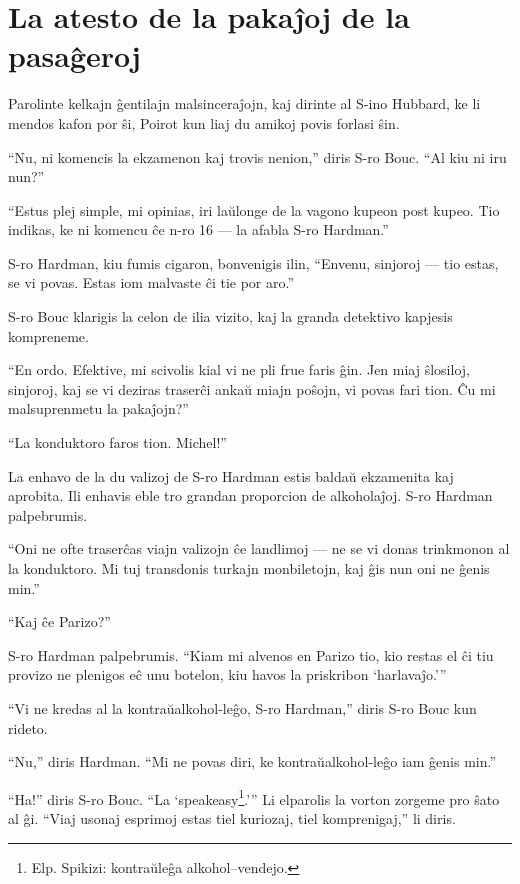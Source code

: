 \chapter[La atesto de la pakaĵoj de la pasaĝeroj]{La atesto de la pakaĵoj de la pasaĝeroj}


Parolinte kelkajn ĝentilajn malsinceraĵojn, kaj dirinte al S-ino Hubbard, ke li mendos kafon por ŝi, Poirot kun liaj du amikoj povis forlasi ŝin.

``Nu, ni komencis la ekzamenon kaj trovis nenion,'' diris S-ro Bouc. ``Al kiu ni iru nun?''

``Estus plej simple, mi opinias, iri laŭlonge de la vagono kupeon post kupeo. Tio indikas, ke ni komencu ĉe n-ro 16 --- la afabla S-ro Hardman.''

S-ro Hardman, kiu fumis cigaron, bonvenigis ilin, ``Envenu, sinjoroj --- tio estas, se vi povas. Estas iom malvaste ĉi tie por aro.''

S-ro Bouc klarigis la celon de ilia vizito, kaj la granda detektivo kapjesis kompreneme.

``En ordo. Efektive, mi scivolis kial vi ne pli frue faris ĝin. Jen miaj ŝlosiloj, sinjoroj, kaj se vi deziras traserĉi ankaŭ miajn poŝojn, vi povas fari tion. Ĉu mi malsuprenmetu la pakaĵojn?''

``La konduktoro faros tion. Michel!''

La enhavo de la du valizoj de S-ro Hardman estis baldaŭ ekzamenita kaj aprobita. Ili enhavis eble tro grandan proporcion de alkoholaĵoj. S-ro Hardman palpebrumis.

``Oni ne ofte traserĉas viajn valizojn ĉe landlimoj --- ne se vi donas trinkmonon al la konduktoro. Mi tuj transdonis turkajn monbiletojn, kaj ĝis nun oni ne ĝenis min.''

``Kaj ĉe Parizo?''

S-ro Hardman palpebrumis. ``Kiam mi alvenos en Parizo tio, kio restas el ĉi tiu provizo ne plenigos eĉ unu botelon, kiu havos la priskribon `harlavaĵo.'''

``Vi ne kredas al la kontraŭalkohol-leĝo, S-ro Hardman,'' diris S-ro Bouc kun rideto.

``Nu,'' diris Hardman. ``Mi ne povas diri, ke kontraŭalkohol-leĝo iam ĝenis min.''

``Ha!'' diris S-ro Bouc. ``La `speakeasy\footnote{Elp. Spikizi: kontraŭleĝa alkohol--vendejo.}.''' Li elparolis la vorton zorgeme pro ŝato al ĝi. ``Viaj usonaj esprimoj estas tiel kuriozaj, tiel komprenigaj,'' li diris.

